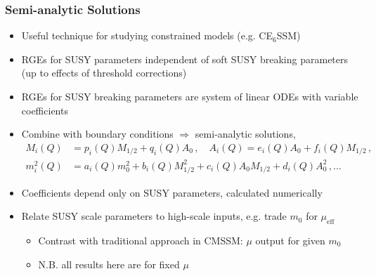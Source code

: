 \documentclass[10pt,aspectratio=169]{beamer}
\begin{document}
\begin{frame}
  \frametitle{Semi-analytic Solutions}
  \begin{itemize}
    \vfill
    \item Useful technique for studying constrained models (e.g. CE$_6$SSM)
    \vfill
    \item RGEs for SUSY parameters independent of soft SUSY breaking
          parameters (up to effects of threshold corrections)
    \vfill
    \item RGEs for SUSY breaking parameters are system of linear ODEs
          with variable coefficients
    \vfill
    \item Combine with boundary conditions $\Rightarrow$
          semi-analytic solutions,
          \begin{align*}
            M_i(Q) &= p_i(Q) M_{1/2} + q_i(Q) A_0 \, , \quad
            A_i(Q) = e_i(Q) A_0 + f_i(Q) M_{1/2} \, , \\
            m_i^2(Q) &= a_i(Q) m_0^2 + b_i(Q) M_{1/2}^2 + c_i(Q) A_0 M_{1/2}
                       + d_i(Q) A_0^2 \, , \ldots
          \end{align*}
    \vfill
    \item Coefficients depend only on SUSY parameters, calculated numerically
    \vfill
    \item Relate SUSY scale parameters to high-scale inputs, e.g. trade
          $m_0$ for $\mu_{\text{eff}}$
          \begin{itemize}
            \item Contrast with traditional approach in CMSSM: $\mu$
                  output for given $m_0$
            \item N.B. all results here are for fixed $\mu$
          \end{itemize}
  \end{itemize}
\end{frame}
\end{document}
